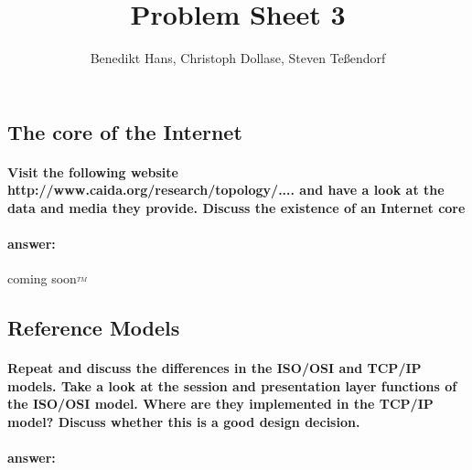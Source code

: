 \documentclass[a4paper,12pt]{article}
\author{Benedikt Hans, Christoph Dollase, Steven Te\ss endorf}
\title{ \textbf{Problem Sheet 3}}
\begin{document}
	 
 \maketitle	 %
 
 \subsection{The core of the Internet}
 \paragraph{Visit the following website http://www.caida.org/research/topology/.... and have a look at the data and media they provide. Discuss the existence of an Internet core}
 \paragraph{answer:}
 
 coming soon$^{_{TM}}$
 
 \subsection{Reference Models}
 \paragraph{Repeat and discuss the differences in the ISO/OSI and TCP/IP models. Take a look at the session and presentation layer functions of the ISO/OSI model. Where are they implemented in the TCP/IP model? Discuss whether this is a good design decision. }
 \paragraph{answer:}
 
\end{document}
